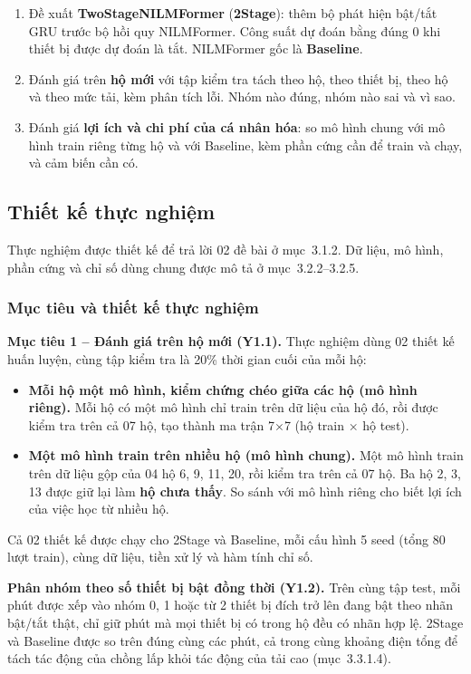 \begin{enumerate}
\item Đề xuất \textbf{TwoStageNILMFormer} (\textbf{2Stage}): thêm bộ phát hiện bật/tắt GRU trước bộ hồi quy NILMFormer. Công suất dự đoán bằng đúng 0 khi thiết bị được dự đoán là tắt. NILMFormer gốc là \textbf{Baseline}.
\item Đánh giá trên \textbf{hộ mới} với tập kiểm tra tách theo hộ, theo thiết bị, theo hộ và theo mức tải, kèm phân tích lỗi. Nhóm nào đúng, nhóm nào sai và vì sao.
\item Đánh giá \textbf{lợi ích và chi phí của cá nhân hóa}: so mô hình chung với mô hình train riêng từng hộ và với Baseline, kèm phần cứng cần để train và chạy, và cảm biến cần có.
\end{enumerate}

\subsection{Thiết kế thực nghiệm}

Thực nghiệm được thiết kế để trả lời 02 đề bài ở mục~3.1.2. Dữ liệu, mô hình, phần cứng và chỉ số dùng chung được mô tả ở mục~3.2.2–3.2.5.

\subsubsection{Mục tiêu và thiết kế thực nghiệm}

\textbf{Mục tiêu 1 – Đánh giá trên hộ mới (Y1.1).} Thực nghiệm dùng 02 thiết kế huấn luyện, cùng tập kiểm tra là 20\% thời gian cuối của mỗi hộ:

\begin{itemize}
\item \textbf{Mỗi hộ một mô hình, kiểm chứng chéo giữa các hộ (mô hình riêng).} Mỗi hộ có một mô hình chỉ train trên dữ liệu của hộ đó, rồi được kiểm tra trên cả 07 hộ, tạo thành ma trận 7$\times$7 (hộ train × hộ test).
\item \textbf{Một mô hình train trên nhiều hộ (mô hình chung).} Một mô hình train trên dữ liệu gộp của 04 hộ 6, 9, 11, 20, rồi kiểm tra trên cả 07 hộ. Ba hộ 2, 3, 13 được giữ lại làm \textbf{hộ chưa thấy}. So sánh với mô hình riêng cho biết lợi ích của việc học từ nhiều hộ.
\end{itemize}

Cả 02 thiết kế được chạy cho 2Stage và Baseline, mỗi cấu hình 5 seed (tổng 80 lượt train), cùng dữ liệu, tiền xử lý và hàm tính chỉ số.

\textbf{Phân nhóm theo số thiết bị bật đồng thời (Y1.2).} Trên cùng tập test, mỗi phút được xếp vào nhóm 0, 1 hoặc từ 2 thiết bị đích trở lên đang bật theo nhãn bật/tắt thật, chỉ giữ phút mà mọi thiết bị có trong hộ đều có nhãn hợp lệ. 2Stage và Baseline được so trên đúng cùng các phút, cả trong cùng khoảng điện tổng để tách tác động của chồng lấp khỏi tác động của tải cao (mục~3.3.1.4).

